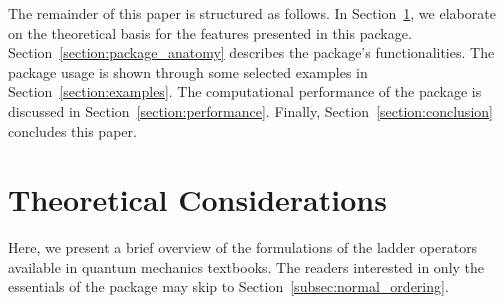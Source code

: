 \documentclass[5p, twocolumn, 10pt, sort&compress]{elsarticle}
\begin{document}
The remainder of this paper is structured as follows. In Section~\ref{section:theoretical_considerations}, we elaborate on the theoretical basis for the features presented in this package. Section~\ref{section:package_anatomy} describes the package's functionalities. The package usage is shown through some selected examples in Section~\ref{section:examples}. The computational performance of the package is discussed in Section~\ref{section:performance}. Finally, Section~\ref{section:conclusion} concludes this paper.


\section{Theoretical Considerations}
\label{section:theoretical_considerations}

Here, we present a brief overview of the formulations of the ladder operators available in quantum mechanics textbooks. The readers interested in only the essentials of the package may skip to Section~\ref{subsec:normal_ordering}. 
\end{document}
